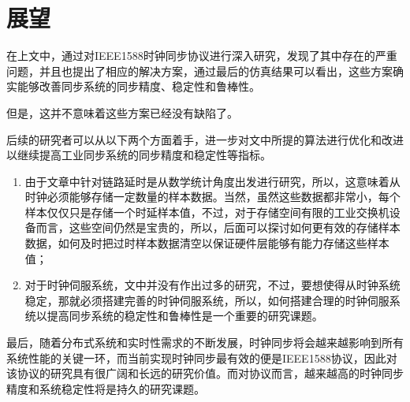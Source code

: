 \section{展望}
在上文中，通过对IEEE1588时钟同步协议进行深入研究，发现了其中存在的严重问题，并且也提出了相应的解决方案，通过最后的仿真结果可以看出，这些方案确实能够改善同步系统的同步精度、稳定性和鲁棒性。

但是，这并不意味着这些方案已经没有缺陷了。

后续的研究者可以从以下两个方面着手，进一步对文中所提的算法进行优化和改进以继续提高工业同步系统的同步精度和稳定性等指标。
\begin{enumerate}[noitemsep,topsep=0pt,parsep=0pt,partopsep=0pt]
	\item 由于文章中针对链路延时是从数学统计角度出发进行研究，所以，这意味着从时钟必须能够存储一定数量的样本数据。当然，虽然这些数据都非常小，每个样本仅仅只是存储一个时延样本值，不过，对于存储空间有限的工业交换机设备而言，这些空间仍然是宝贵的，所以，后面可以探讨如何更有效的存储样本数据，如何及时把过时样本数据清空以保证硬件层能够有能力存储这些样本值；
	\item 对于时钟伺服系统，文中并没有作出过多的研究，不过，要想使得从时钟系统稳定，那就必须搭建完善的时钟伺服系统，所以，如何搭建合理的时钟伺服系统以提高同步系统的稳定性和鲁棒性是一个重要的研究课题。
\end{enumerate}

最后，随着分布式系统和实时性需求的不断发展，时钟同步将会越来越影响到所有系统性能的关键一环，而当前实现时钟同步最有效的便是IEEE1588协议，因此对该协议的研究具有很广阔和长远的研究价值。而对协议而言，越来越高的时钟同步精度和系统稳定性将是持久的研究课题。